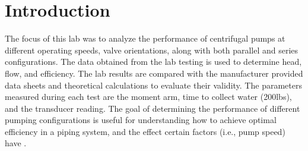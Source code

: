 \section{Introduction}
The focus of this lab was to analyze the performance of centrifugal pumps at different operating speeds, valve orientations, along with both parallel and series configurations. The data obtained from the lab testing is used to determine head, flow, and efficiency. The lab results are compared with the manufacturer provided data sheets and theoretical calculations to evaluate their validity. The parameters measured during each test are the moment arm, time to collect water (200lbs), and the transducer reading. The goal of determining the performance of different pumping configurations is useful for understanding how to achieve optimal efficiency in a piping system, and the effect certain factors (i.e., pump speed) have \cite{pump_design}.